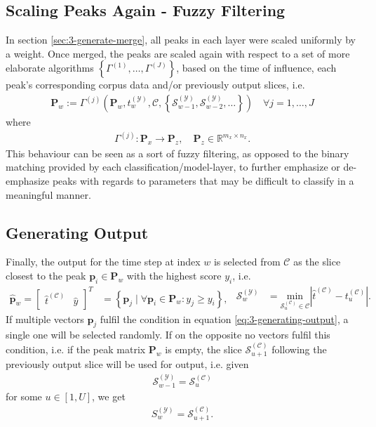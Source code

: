 \subsection{Scaling Peaks Again - Fuzzy Filtering}\label{sec:3-generate-scale}
In section \ref{sec:3-generate-merge}, all peaks in each layer were scaled uniformly by a weight. Once merged, the peaks are scaled again with respect to a set of more elaborate algorithms $\left\lbrace \Gamma^{(1)}, \dots, \Gamma^{(J)}\right\rbrace$, based on the time of influence, each peak's corresponding corpus data and/or previously output slices, i.e.
\begin{align}\label{eq:3-peak-scaling-generic}
	\bm P_w := \Gamma^{(j)}\left(\bm P_w	, t^{(\mathcal Y)}_w, \mathcal C, \left\lbrace \mathcal S^{(\mathcal Y)}_{w-1}, \mathcal S^{(\mathcal Y)}_{w-2},\dots\right\rbrace\right) \quad \forall j = 1,\dots,J
\end{align}
where\begin{align}
	\Gamma^{(j)}\colon \bm P_x \rightarrow \bm P_z, 
	\quad \bm P_z \in \mathbb R^{m_x\times n_x}.
\end{align}
This behaviour can be seen as a sort of fuzzy filtering, as opposed to the binary matching provided by each classification/model-layer, to further emphasize or de-emphasize peaks with regards to parameters that may be difficult to classify in a meaningful manner. 
\subsection{Generating Output}\label{sec:3-generate-output}
Finally, the output for the time step at index $w$ is selected from $\mathcal C$ as the slice closest to the peak $\bm p_i \in \bm P_w$ with the highest score $y_i$, i.e.
\begin{subequations}
\begin{align}\label{eq:3-generating-output}
	\bm{\hat p}_w = \begin{bmatrix} \hat t^{(\mathcal C)} & \hat y \end{bmatrix}^T &= \left\lbrace \bm p_j \mid \forall \bm p_i \in \bm P_w \colon y_j \ge y_i \right\rbrace,
\end{align}
\begin{align}
	\mathcal S^{(\mathcal Y)}_w &= \underset{\mathcal S^{(\mathcal C)}_u \in \mathcal C}{\text{min}} \left \lvert \hat t^{(\mathcal C)} - t^{(\mathcal C)}_u \right\rvert.
\end{align}
\end{subequations}
If multiple vectors $\bm p_j$ fulfil the condition in equation \ref{eq:3-generating-output}, a single one will be selected randomly. If on the opposite no vectors fulfil this condition, i.e. if the peak matrix $\bm P_w$ is empty, the slice $\mathcal S^{(\mathcal C)}_{u+1}$ following the previously output slice will be used for output, i.e. given 
	\begin{align}
		\mathcal S^{(\mathcal Y)}_{w-1} = \mathcal S^{(\mathcal C)}_u
	\end{align}
	for some $u \in [1, U]$, we get
	\begin{align}\label{eq:3-generating-default-output}
		S^{(\mathcal Y)}_w = \mathcal S^{(\mathcal C)}_{u +1}.
	\end{align}